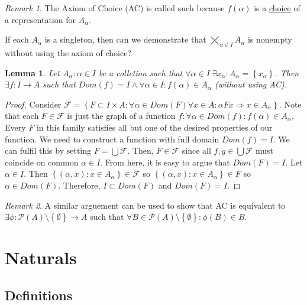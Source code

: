 \documentclass{article}
\renewcommand\O{\ensuremath{\emptyset}}
\newtheorem{lemma}[theorem]{Lemma}
\theoremstyle{definition}
\theoremstyle{remark}
\newtheorem*{remark}{Remark}
\theoremstyle{plain}
\begin{document}
\begin{remark}
    The Axiom of Choice (AC) is called such because \(f(\alpha)\) is a \underline{choice} of a representation for \(A_{\alpha}\).
\end{remark}

If each \(A_{\alpha}\) is a singleton, then can we demonstrate that \(\bigtimes\limits_{\alpha\in I}A_{\alpha}\) is nonempty without using the axiom of choice? 

\begin{lemma}
    Let \(A_{\alpha}: \alpha \in I\) be a colletion such that \(\forall \alpha \in I \; \exists x_{\alpha}: A_{\alpha} = \left\{ x_{\alpha} \right\}\). Then \(\exists f : I \to A\) such that \(Dom(f) = I \land \forall \alpha \in I: f(\alpha) \in A_{\alpha}\) (without using AC).
\end{lemma}
\begin{proof}
    Consider \(\mathcal{F} = \left\{ F \subset I\times A : \forall \alpha \in Dom(F)\forall x \in A: \alpha F x \Rightarrow x \in A_{\alpha}  \right\}\). 
    Note that each \(F \in \mathcal{F}\) is just the graph of a function \(f: \forall \alpha \in Dom(f): f(\alpha) \in A_{\alpha}\). Every \(F\) in this family satisfies all but one of the desired properties of our function. 
    We need to construct a function with full domain \(Dom(f) = I\). We can fulfil this by setting \(F = \bigcup \mathcal{F}\). Then, \(F \in \mathcal{F}\) since all \(f,g \in \bigcup \mathcal{F}\) must coincide on common \(\alpha \in I\).
    From here, it is easy to argue that \(Dom(F) = I\). Let \(\alpha \in I\). Then \(\left\{ (\alpha, x) : x \in A_{\alpha} \right\} \in \mathcal{F}\) so \(\left\{ (\alpha, x) : x \in A_{\alpha} \right\} \in F\) so \(\alpha \in Dom(F)\). Therefore, \(I \subset Dom(F)\) and \(Dom(F) = I\).
\end{proof}

\begin{remark}
    A similar arguement can be used to show that AC is equivalent to \(\exists \phi: \mathcal{P}(A)\setminus \left\{ \O \right\} \to A\) such that \(\forall B \in \mathcal{P}(A)\setminus \left\{ \O \right\}: \phi(B)\in B\).  
\end{remark}

\section{Naturals}
\subsection{Definitions}
\end{document}
